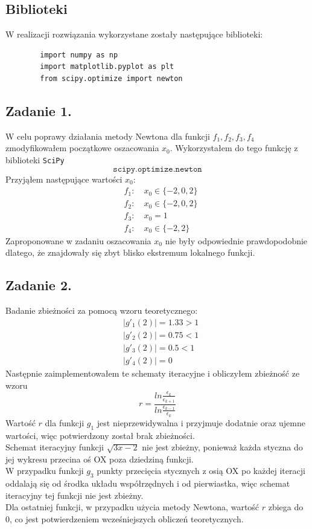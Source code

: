 \documentclass[11pt, leqno]{scrartcl}
\begin{document}
    \subsection{Biblioteki}
    W realizacji rozwiązania wykorzystane zostały następujące
    biblioteki:
    \begin{lstlisting}
        import numpy as np
        import matplotlib.pyplot as plt
        from scipy.optimize import newton
    \end{lstlisting}

    \subsection{Zadanie 1.}
    W celu poprawy działania metody Newtona dla funkcji
    $f_1,f_2,f_3,f_4$ zmodyfikowałem początkowe oszacowania
    $x_0$. Wykorzystałem do tego funkcję z biblioteki
    \texttt{SciPy}
    \[
        \texttt{scipy.optimize.newton}
    \]
    Przyjąłem następujące wartości $x_0$:
    \begin{align*}
        &f_1: \quad x_0\in \{-2,0,2\} \\
        &f_2: \quad x_0\in \{-2,0,2\} \\
        &f_3: \quad x_0=1 \\
        &f_4: \quad x_0\in \{-2,2\}
    \end{align*}
    Zaproponowane w zadaniu oszacowania $x_0$ nie były
    odpowiednie prawdopodobnie dlatego, że znajdowały się
    zbyt blisko ekstremum lokalnego funkcji.

    \subsection{Zadanie 2.}
    Badanie zbieżności za pomocą wzoru teoretycznego:
    \begin{align*}
        &|g'_1(2)|=1.33>1 \\
        &|g'_2(2)|=0.75<1 \\
        &|g'_3(2)|=0.5<1 \\
        &|g'_4(2)|=0
    \end{align*}
    Następnie zaimplementowałem te schematy iteracyjne
    i obliczyłem zbieżność ze wzoru
    \[
        r=\frac{ln\frac{\epsilon_k}{\epsilon_{k+1}}}
            {ln\frac{\epsilon_{k-1}}{\epsilon_k}}
    \]
    Wartość $r$ dla funkcji $g_1$ jest nieprzewidywalna
    i przyjmuje dodatnie oraz ujemne wartości, więc
    potwierdzony został brak zbieżności. \\
    Schemat iteracyjny funkcji $\sqrt{3x-2}$ nie jest
    zbieżny, ponieważ każda styczna do jej wykresu
    przecina oś OX poza dziedziną funkcji. \\
    W przypadku funkcji $g_3$ punkty przecięcia
    stycznych z osią OX po każdej iteracji oddalają
    się od środka układu współrzędnych i od pierwiastka,
    więc schemat iteracyjny tej funkcji nie jest
    zbieżny. \\
    Dla ostatniej funkcji, w przypadku użycia metody
    Newtona, wartość $r$ zbiega do 0, co jest
    potwierdzeniem wcześniejszych obliczeń teoretycznych.
    
\end{document}
